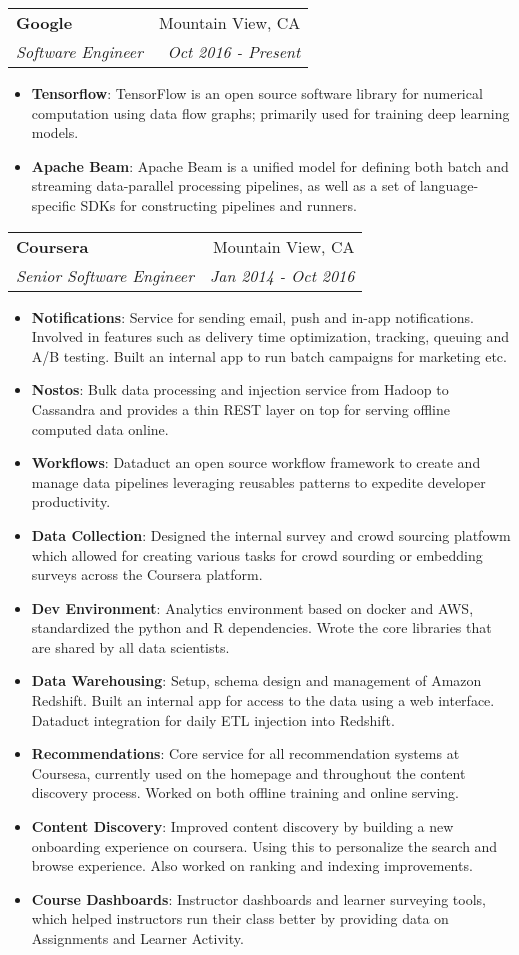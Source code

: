 \documentclass[letterpaper,11pt]{article}
\makeatletter
\newcommand{\resumeItem}[2]{
  \item\small{
    \textbf{#1}{: #2 \vspace{-2pt}}
  }
}
\newcommand{\resumeSubheading}[4]{
  \vspace{-1pt}\item
    \begin{tabular*}{0.97\textwidth}{l@{\extracolsep{\fill}}r}
      \textbf{#1} & #2 \\
      \textit{\small#3} & \textit{\small #4} \\
    \end{tabular*}\vspace{-5pt}
}
\newcommand{\resumeItemListStart}{\begin{itemize}}
\newcommand{\resumeItemListEnd}{\end{itemize}\vspace{-5pt}}
\makeatother
\begin{document}
    \resumeSubheading
      {Google}{Mountain View, CA}
      {Software Engineer}{Oct 2016 - Present}
      \resumeItemListStart
        \resumeItem{Tensorflow}
          {TensorFlow is an open source software library for numerical computation using data flow graphs; primarily used for training deep learning models.}
        \resumeItem{Apache Beam}
          {Apache Beam is a unified model for defining both batch and streaming data-parallel processing pipelines, as well as a set of language-specific SDKs for constructing pipelines and runners.}
      \resumeItemListEnd

    \resumeSubheading
      {Coursera}{Mountain View, CA}
      {Senior Software Engineer}{Jan 2014 - Oct 2016}
      \resumeItemListStart
        \resumeItem{Notifications}
          {Service for sending email, push and in-app notifications. Involved in features such as delivery time optimization, tracking, queuing and A/B testing. Built an internal app to run batch campaigns for marketing etc.}
        \resumeItem{Nostos}
          {Bulk data processing and injection service from Hadoop to Cassandra and provides a thin REST layer on top for serving offline computed data online.}
        \resumeItem{Workflows}
          {Dataduct an open source workflow framework to create and manage data pipelines leveraging reusables patterns to expedite developer productivity.}
        \resumeItem{Data Collection}
          {Designed the internal survey and crowd sourcing platfowm which allowed for creating various tasks for crowd sourding or embedding surveys across the Coursera platform.}
        \resumeItem{Dev Environment}
          {Analytics environment based on docker and AWS, standardized the python and R dependencies. Wrote the core libraries that are shared by all data scientists.}
        \resumeItem{Data Warehousing}
          {Setup, schema design and management of Amazon Redshift. Built an internal app for access to the data using a web interface. Dataduct integration for daily ETL injection into Redshift.}
        \resumeItem{Recommendations}
          {Core service for all recommendation systems at Coursesa, currently used on the homepage and throughout the content discovery process. Worked on both offline training and online serving.}
        \resumeItem{Content Discovery}
          {Improved content discovery by building a new onboarding experience on coursera. Using this to personalize the search and browse experience. Also worked on ranking and indexing improvements.}
        \resumeItem{Course Dashboards}
          {Instructor dashboards and learner surveying tools, which helped instructors run their class better by providing data on Assignments and Learner Activity.}
      \resumeItemListEnd
\end{document}
